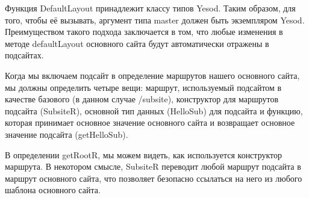 Функция DefaultLayout принадлежит классу типов Yesod. Таким образом, для того, чтобы её вызывать, аргумент типа master должен быть экземпляром Yesod.  Преимуществом такого подхода заключается в том, что любые изменения в методе defaultLayout основного сайта будут автоматически отражены в подсайтах.

Когда мы включаем подсайт в определение маршрутов нашего основного сайта, мы должны определить четыре вещи: маршрут, используемый подсайтом в качестве базового (в данном случае /subsite), конструктор для маршрутов подсайта (SubsiteR), основной тип данных (HelloSub) для подсайта и функцию, которая принимает основное значение основного сайта и возвращает основное значение подсайта (getHelloSub).

В определении getRootR, мы можем видеть, как используется конструктор маршрута. В некотором смысле, SubsiteR переводит любой маршрут подсайта в маршрут основного сайта, что позволяет безопасно ссылаться на него из любого шаблона основного сайта.
